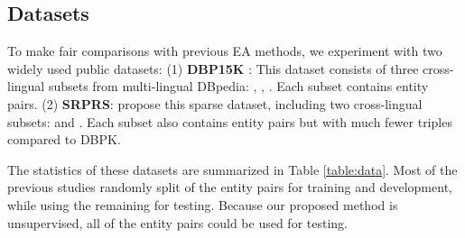 \documentclass[11pt]{article}
\begin{document}
\subsection{Datasets}
To make fair comparisons with previous EA methods, we experiment with two widely used public datasets:
(1) \textbf{DBP15K} \cite{DBLP:conf/semweb/SunHL17}:
This dataset consists of three cross-lingual subsets from multi-lingual DBpedia: , , .
Each subset contains  entity pairs.
(2) \textbf{SRPRS}:
\citet{DBLP:conf/icml/GuoSH19} propose this sparse dataset, including two cross-lingual subsets:  and .
Each subset also contains  entity pairs but with much fewer triples compared to DBPK.


\begin{table}[t]
\begin{center}
\end{center}
\caption{Statistical data of DBP15K and SRPRS.}\label{table:data}
\end{table}


The statistics of these datasets are summarized in Table \ref{table:data}.
Most of the previous studies\cite{DBLP:conf/emnlp/WangLLZ18,DBLP:conf/acl/CaoLLLLC19} randomly split  of the entity pairs for training and development, while using the remaining  for testing.
Because our proposed method is unsupervised, all of the entity pairs could be used for testing.
\end{document}
